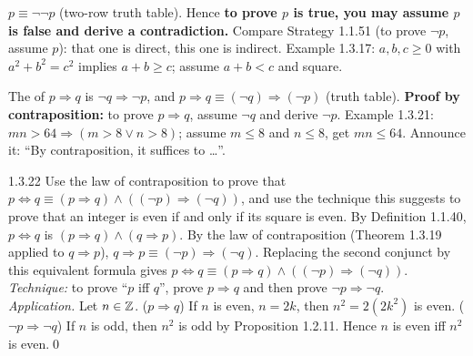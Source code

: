\begin{result}
$p\equiv\neg\neg p$ (two-row truth table). Hence \textbf{to prove $p$ is true, you may assume $p$ is false and derive a contradiction.} Compare Strategy 1.1.51 (to prove $\neg p$, assume $p$): that one is direct, this one is indirect. Example 1.3.17: $a,b,c\ge0$ with $a^2+b^2=c^2$ implies $a+b\ge c$; assume $a+b<c$ and square.
\end{result}
\begin{result}
The  of $p\Rightarrow q$ is $\neg q\Rightarrow\neg p$, and $p\Rightarrow q\equiv(\neg q)\Rightarrow(\neg p)$ (truth table). \textbf{Proof by contraposition:} to prove $p\Rightarrow q$, assume $\neg q$ and derive $\neg p$. Example 1.3.21: $mn>64\Rightarrow(m>8\vee n>8)$; assume $m\le8$ and $n\le8$, get $mn\le64$. Announce it: ``By contraposition, it suffices to \dots''.
\end{result}

\begin{bookex}[essential]{1.3.22}
Use the law of contraposition to prove that $p\Leftrightarrow q\equiv(p\Rightarrow q)\wedge((\neg p)\Rightarrow(\neg q))$, and use the technique this suggests to prove that an integer is even if and only if its square is even.
\solution
By Definition 1.1.40, $p\Leftrightarrow q$ is $(p\Rightarrow q)\wedge(q\Rightarrow p)$. By the law of contraposition (Theorem 1.3.19 applied to $q\Rightarrow p$), $q\Rightarrow p\equiv(\neg p)\Rightarrow(\neg q)$. Replacing the second conjunct by this equivalent formula gives $p\Leftrightarrow q\equiv(p\Rightarrow q)\wedge((\neg p)\Rightarrow(\neg q))$.\\
\emph{Technique:} to prove ``$p$ iff $q$'', prove $p\Rightarrow q$ and then prove $\neg p\Rightarrow\neg q$.\\
\emph{Application.} Let $n\in\mathbb{Z}$. ($p\Rightarrow q$) If $n$ is even, $n=2k$, then $n^2=2(2k^2)$ is even. ($\neg p\Rightarrow\neg q$) If $n$ is odd, then $n^2$ is odd by Proposition 1.2.11. Hence $n$ is even iff $n^2$ is even.\qed
\end{bookex}

